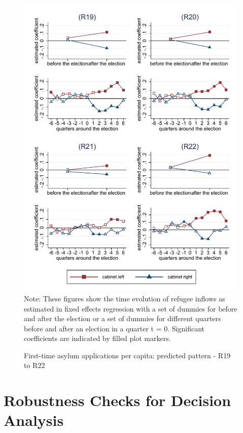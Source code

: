 \documentclass[11pt,a4paper]{scrartcl}
\begin{document}
\clearpage
\FloatBarrier
\begin{figure}[!ht]
	\caption{First-time asylum applications per capita: predicted pattern - R19 to R22}
	\includegraphics[width=1\textwidth]{../results/applications/app_graphs_R19-R22.pdf}
	\footnotesize{Note: These figures show the time evolution of refugee inflows as estimated in fixed effects regression
		with a set of dummies for before and after the election or a set of dummies for different quarters before and after an election in a quarter t = 0. Significant coefficients are indicated by filled plot markers.}
\end{figure}

\clearpage
\FloatBarrier




\clearpage
\FloatBarrier
\section{Robustness Checks for Decision Analysis}
\end{document}
